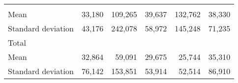 \begin{tabular}{llllll}
  \multicolumn{1}{|r}{} &
  \multicolumn{1}{r}{} &
  \multicolumn{1}{r}{} &
  \multicolumn{1}{r}{} &
  \multicolumn{1}{r}{} \\
\multicolumn{1}{l}{\hspace{4em}Mean} &
  \multicolumn{1}{|r}{33,180} &
  \multicolumn{1}{r}{109,265} &
  \multicolumn{1}{r}{39,637} &
  \multicolumn{1}{r}{132,762} &
  \multicolumn{1}{r}{38,330} \\
\multicolumn{1}{l}{\hspace{4em}Standard deviation} &
  \multicolumn{1}{|r}{43,176} &
  \multicolumn{1}{r}{242,078} &
  \multicolumn{1}{r}{58,972} &
  \multicolumn{1}{r}{145,248} &
  \multicolumn{1}{r}{71,235} \\
\multicolumn{1}{l}{\hspace{3em}Total} &
  \multicolumn{1}{|r}{} &
  \multicolumn{1}{r}{} &
  \multicolumn{1}{r}{} &
  \multicolumn{1}{r}{} &
  \multicolumn{1}{r}{} \\
\multicolumn{1}{l}{\hspace{4em}Mean} &
  \multicolumn{1}{|r}{32,864} &
  \multicolumn{1}{r}{59,091} &
  \multicolumn{1}{r}{29,675} &
  \multicolumn{1}{r}{25,744} &
  \multicolumn{1}{r}{35,310} \\
\multicolumn{1}{l}{\hspace{4em}Standard deviation} &
  \multicolumn{1}{|r}{76,142} &
  \multicolumn{1}{r}{153,851} &
  \multicolumn{1}{r}{53,914} &
  \multicolumn{1}{r}{52,514} &
  \multicolumn{1}{r}{86,910} \\
\cline{1-6}
\end{tabular}

